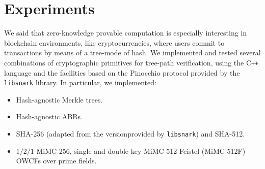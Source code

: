 \section{Experiments}\label{sec:experiments}
We said that zero-knowledge provable computation is especially interesting in blockchain
environments, like cryptocurrencies, where users commit to transactions by means of a tree-mode of
hash.
We implemented and tested several combinations of cryptographic primitives for tree-path
verification, using the C\texttt{++} language and the facilities based on the Pinocchio protocol
provided by the \texttt{libsnark} library.
In particular, we implemented:
\begin{itemize}
	\item Hash-agnostic Merkle trees.
	\item Hash-agnostic ABRs.
	\item SHA-256 (adapted from the versionprovided by \texttt{libsnark}) and SHA-512.
	\item \(1/2/1\) MiMC-256, single and double key MiMC-512 Feistel (MiMC-512F) OWCFs
	      over prime fields.
\end{itemize}

